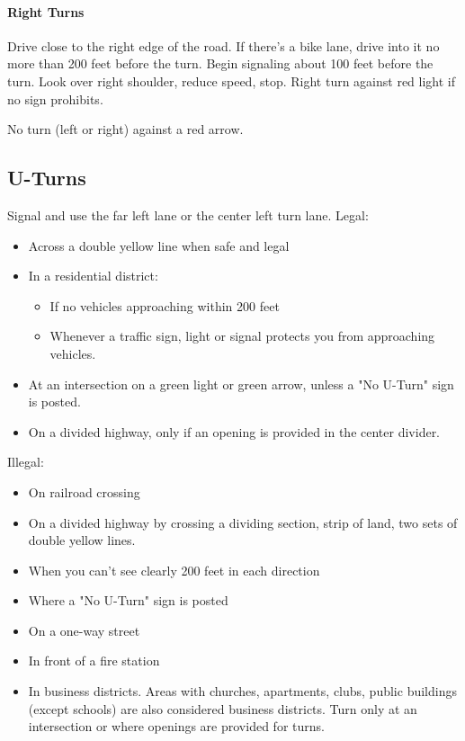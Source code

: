 \paragraph{Right Turns}
Drive close to the right edge of the road.
If there's a bike lane, drive into it no more than 200 feet before the turn.
Begin signaling about 100 feet before the turn.
Look over right shoulder, reduce speed, stop.
Right turn against red light if no sign prohibits.

No turn (left or right) against a red arrow.

\subsection{U-Turns}

Signal and use the far left lane or the center left turn lane.
Legal:
\begin{itemize}
\item Across a double yellow line when safe and legal
\item In a residential district:
	\begin{itemize}
	\item If no vehicles approaching within 200 feet
	\item Whenever a traffic sign, light or signal
	protects you from approaching vehicles.
	\end{itemize}
\item At an intersection on a green light or green arrow,
unless a "No U-Turn" sign is posted.

\item On a divided highway,
only if an opening is provided in the center divider.
\end{itemize}

Illegal:
\begin{itemize}
\item On railroad crossing
\item On a divided highway by crossing a dividing section, strip of land,
two sets of double yellow lines.
\item When you can't see clearly 200 feet in each direction
\item Where a "No U-Turn" sign is posted
\item On a one-way street
\item In front of a fire station
\item In business districts.
Areas with churches, apartments, clubs, public buildings (except schools)
are also considered business districts.
Turn only at an intersection or where openings are provided for turns.
\end{itemize}


